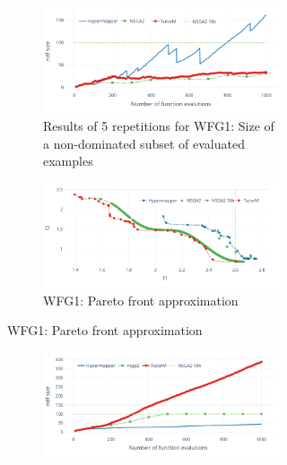     \begin{figure}[!h]
        \centering
        \begin{subfigure}{\textwidth}
            \begin{subfigure}{0.5\textwidth}
                \includegraphics[width=\textwidth]{content/images/wfg1_ndf}
                \caption{Results of 5 repetitions for WFG1: Size of a non-dominated subset of evaluated examples}
                \label{fig:wfg1_ndf}
            \end{subfigure} 
            \begin{subfigure}{0.5\textwidth}
                \includegraphics[width=\textwidth]{content/images/wfg1_front}
                \caption{WFG1: Pareto front approximation}
                \label{fig:wfg1_front}
            \end{subfigure} 
        \end{subfigure} 
        \begin{subfigure}{\textwidth}
            \begin{subfigure}{0.5\textwidth}
                \includegraphics[width=\textwidth]{content/images/wfg4_ndf}

\end{subfigure}
\end{subfigure}
\end{figure}
